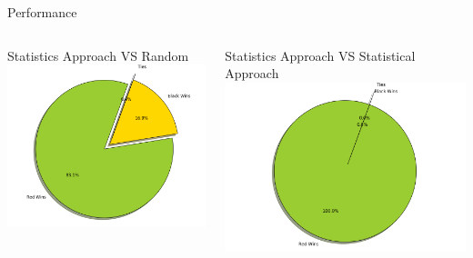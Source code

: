 \documentclass[aspectratio=169]{beamer}
\begin{document}
\begin{frame}{Performance}
    \begin{columns}
	 	\begin{column}{0.5\textwidth}
	 	Statistics Approach VS Random
			\centering
			\includegraphics[scale = .35]{statVsrand.png}
	 	\end{column}
 		\begin{column}{0.5\textwidth}
 		Statistics Approach VS Statistical Approach
			\centering
			\includegraphics[scale = 0.35]{statVsstat.png}	
	 	\end{column}
	 \end{columns}
	
\end{frame}
\end{document}
